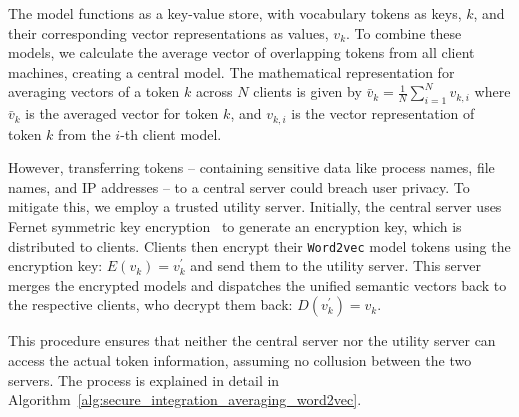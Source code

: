 The \wordvec model functions as a key-value store, with vocabulary tokens as keys, \(k\), and their corresponding vector representations as values, \(v_k\). To combine these models, we calculate the average vector of overlapping tokens from all client machines, creating a central model. The mathematical representation for averaging vectors of a token \(k\) across \(N\) clients is given by \(\bar{v}_k = \frac{1}{N}\sum_{i=1}^{N} v_{k,i}\) where \(\bar{v}_k\) is the averaged vector for token \(k\), and \(v_{k,i}\) is the vector representation of token \(k\) from the \(i\)-th client model.

However, transferring tokens -- containing sensitive data like process names, file names, and IP addresses -- to a central server could breach user privacy. To mitigate this, we employ a trusted utility server. Initially, the central server uses Fernet symmetric key encryption~\cite{ismail2020fernet,bokhari2016review} to generate an encryption key, which is distributed to clients. Clients then encrypt their \texttt{Word2vec} model tokens using the encryption key: \( E(v_{k}) = v_{k}^{'} \) and send them to the utility server. This server merges the encrypted models and dispatches the unified semantic vectors back to the respective clients, who decrypt them back: \( D(v_{k}^{'}) = v_{k} \).

This procedure ensures that neither the central server nor the utility server can access the actual token information, assuming no collusion between the two servers. The process is explained in detail in Algorithm~\ref{alg:secure_integration_averaging_word2vec}.


